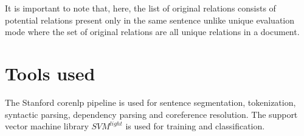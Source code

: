 It is important to note that, here, the list of original relations consists of potential relations present only in the same sentence unlike unique evaluation mode where the set of original relations are all unique relations in a document.

\section{Tools used}\label{sec:tools}

The Stanford corenlp pipeline \cite{manning2014stanford} is used for sentence segmentation, tokenization, syntactic parsing, dependency parsing and coreference resolution. The support vector machine library $SVM^{light}$ \cite{joachims1999making} is used for training and classification.
